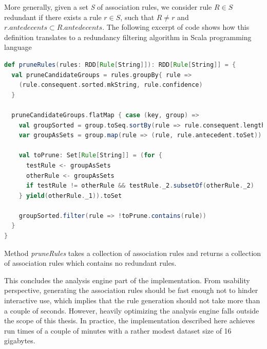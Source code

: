More generally, given a set \textit{S} of association rules, we consider rule $R \in S$ redundant if there exists a rule $r \in S$, such that $R \neq r$ and $r.antedecents \subset R.antedecents$. The following excerpt of code shows how this definition translates to a redundancy filtering algorithm in Scala programming language
    
\begin{minipage}{\linewidth}
\begin{lstlisting}[language=scala] 
def pruneRules(rules: RDD[Rule[String]]): RDD[Rule[String]] = {
  val pruneCandidateGroups = rules.groupBy{ rule => 
    (rule.consequent.sorted.mkString, rule.confidence) 
  }

  pruneCandidateGroups.flatMap { case (key, group) =>
    val groupSorted = group.toSeq.sortBy(rule => rule.consequent.length)
    var groupAsSets = group.map(rule => (rule, rule.antecedent.toSet))

    val toPrune: Set[Rule[String]] = (for {
      testRule <- groupAsSets
      otherRule <- groupAsSets
      if testRule != otherRule && testRule._2.subsetOf(otherRule._2)
    } yield(otherRule._1)).toSet
    
    groupSorted.filter(rule => !toPrune.contains(rule))
  }
}
\end{lstlisting}
\end{minipage}       

Method \textit{pruneRules} takes a collection of association rules and returns a collection of association rules which contains no redundant rules.

This concludes the analysis engine part of the implementation. From usability perspective, generating the association rules should be fast enough not to hinder interactive use, which implies that the rule generation should not take more than a couple of seconds. However, heavily optimizing the analysis engine falls outside the scope of this thesis. In practice, the implementation described here achieves run times of a couple of minutes with a rather modest dataset size of 16 gigabytes.


   